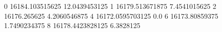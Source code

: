 0 16184.103515625 12.0439453125
1 16179.513671875 7.4541015625
2 16176.265625 4.2060546875
4 16172.0595703125 0.0
6 16173.80859375 1.7490234375
8 16178.4423828125 6.3828125
